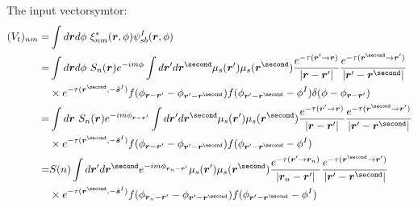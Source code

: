 \documentclass [10pt,letterpaper]{article}
\newcommand{\unitvectorsym}[1]{\hat{\vectorsym{#1}}}
\begin{document}
The input vectorsymtor:
\begin{equation} \label{eq:der-Vtnm-1pt-1}
	\begin{split}
		(V_t)_{n m}
		=&
		\int d\vectorsym{r} d\phi
		\ \xi^*_{n m}(\vectorsym{r},\phi)
		\psi_{sb}^I(\vectorsym{r},\phi)
		\\
		=&
		\int d\vectorsym{r} d\phi
		\ S_n(\vectorsym{r})
		e^{-i m \phi}
		\int d\vectorsym{r}^\prime d\vectorsym{r}^\second
		\mu_s(\vectorsym{r}^\prime)
		\mu_s(\vectorsym{r}^\second)
		\frac
		{e^{-\tau(\vectorsym{r}^\prime\to\vectorsym{r})}}
		{\lvert \vectorsym{r}-\vectorsym{r}^\prime \rvert}
		\frac
		{e^{-\tau(\vectorsym{r}^\second\to\vectorsym{r}^\prime)}}
		{\lvert \vectorsym{r}^\prime-\vectorsym{r}^\second \rvert}
		\\
		&
		\times
		e^{-\tau(\vectorsym{r}^\second,-\unitvectorsym{s}^I)} 
		f(\phi_{\vectorsym{r}-\vectorsym{r}^\prime}-\phi_{\vectorsym{r}^\prime-\vectorsym{r}^\second})
		f(\phi_{\vectorsym{r}^\prime-\vectorsym{r}^\second}-\phi^I)
		\delta(\phi-\phi_{\vectorsym{r}-\vectorsym{r}^\prime})
		\\
		=&
		\int d\vectorsym{r}
		\ S_n(\vectorsym{r})
		e^{-i m \phi_{\vectorsym{r}-\vectorsym{r}^\prime}}
		\int d\vectorsym{r}^\prime d\vectorsym{r}^\second
		\mu_s(\vectorsym{r}^\prime)
		\mu_s(\vectorsym{r}^\second)
		\frac
		{e^{-\tau(\vectorsym{r}^\prime\to\vectorsym{r})}}
		{\lvert \vectorsym{r}-\vectorsym{r}^\prime \rvert}
		\frac
		{e^{-\tau(\vectorsym{r}^\second\to\vectorsym{r}^\prime)}}
		{\lvert \vectorsym{r}^\prime-\vectorsym{r}^\second \rvert}
		\\
		&
		\times
		e^{-\tau(\vectorsym{r}^\second,-\unitvectorsym{s}^I)} 
		f(\phi_{\vectorsym{r}-\vectorsym{r}^\prime}-\phi_{\vectorsym{r}^\prime-\vectorsym{r}^\second})
		f(\phi_{\vectorsym{r}^\prime-\vectorsym{r}^\second}-\phi^I)
		\\
		=&
		S(n)
		\int d\vectorsym{r}^\prime d\vectorsym{r}^\second
		e^{-i m \phi_{\vectorsym{r}_n-\vectorsym{r}^\prime}}
		\mu_s(\vectorsym{r}^\prime)
		\mu_s(\vectorsym{r}^\second)
		\frac
		{e^{-\tau(\vectorsym{r}^\prime\to\vectorsym{r}_n)}}
		{\lvert \vectorsym{r}_n-\vectorsym{r}^\prime \rvert}
		\frac
		{e^{-\tau(\vectorsym{r}^\second\to\vectorsym{r}^\prime)}}
		{\lvert \vectorsym{r}^\prime-\vectorsym{r}^\second \rvert}
		\\
		&
		\times
		e^{-\tau(\vectorsym{r}^\second,-\unitvectorsym{s}^I)} 
		f(\phi_{\vectorsym{r}_n-\vectorsym{r}^\prime}-\phi_{\vectorsym{r}^\prime-\vectorsym{r}^\second})
		f(\phi_{\vectorsym{r}^\prime-\vectorsym{r}^\second}-\phi^I)
	\end{split}
\end{equation}
\end{document}

